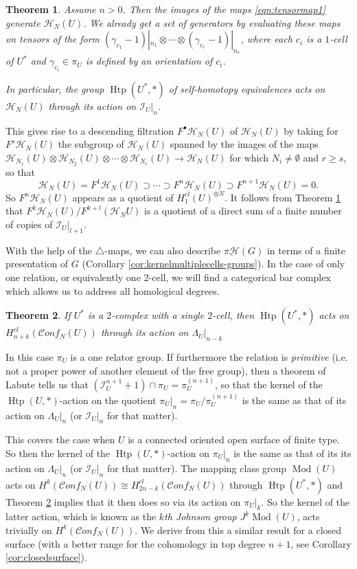 \documentclass[12pt,letterpaper]{amsart}
\numberwithin{equation}{section}
\def\g{\gamma}
\def\tri{\triangle}
\def\Hcal{{\mathcal H}}
\def\Ical{{\mathcal I}}
\def\pt{{\scriptscriptstyle\bullet}}
\newcommand\conf{\mathscr{C}\!\mathit{onf}\!}
\newcommand\Htp{\operatorname{Htp}}
\newcommand\Mod{\operatorname{Mod}}
\newtheorem{theorem}{Theorem}[section]
\theoremstyle{remark}
\begin{document}
\begin{theorem}\label{thm:generation}
Assume $n>0$. Then the images of the  maps \eqref{eqn:tensormap1} generate $\Hcal_N(U)$. We  already get a set of generators by evaluating these maps on  tensors of the form $(\g_{c_1}-1)|_{n_1}\otimes\cdots\otimes (\g_{c_r}-1)|_{n_r}$, where each $c_i$ is a $1$-cell of $U^*$ and $\g_{c_i}\in \pi_U$ is defined by an orientation of $c_i$.

In particular,  the group $\Htp(U^*,*)$ of self-homotopy equivalences acts on $\Hcal_N(U)$  through its action on $\Ical_{U}|_n$.
\end{theorem} 

This gives rise to a descending filtration $F^\pt\Hcal_N(U)$ of $\Hcal_N(U)$ by taking for  $F^s\Hcal_N(U)$ the  subgroup of
$\Hcal_N(U)$ spanned by the images of the maps   $\Hcal_{N_1}(U)\otimes\Hcal_{N_2}(U)\otimes\cdots \otimes\Hcal_{N_r}(U)\to \Hcal_N(U)$ for which $N_i\not=\emptyset$ and $r\ge s$, so that  
\[
\Hcal_N(U)=F^1\Hcal_N(U)\supset \cdots  \supset F^{n}\Hcal_N(U)\supset F^{n+1}\Hcal_N(U)=0.
\]
So  $F^{n} \Hcal_N(U)$ appears as a quotient of $H^{cl}_1(U)^{\otimes N}$. It follows from Theorem \ref{thm:generation} that $F^k\Hcal_N(U)/F^{k+l}(\Hcal_NU)$  is a quotient of a direct sum of a finite number of copies of  $\Ical_{U}|_{l+1}$.

With the help of the $\tri$-maps, we can also  describe $\underline{\pi\Hcal}(G)$ in terms of  a finite presentation of $G$ (Corollary \ref{cor:kernelmultiplecells-groups}). In the case of only one relation, or equivalently one $2$-cell, we will find a categorical bar complex which allows us to address all homological degrees.

\begin{theorem}\label{thm:generation1}
If $U^*$  is a $2$-complex with a single $2$-cell, then $\Htp(U^*,*)$ acts on $H^{cl}_{n+k}(\conf_N(U))$
through its action on $\Lambda_U|_{n-k}$
\end{theorem}  
 
In this case $\pi_U$ is a one relator group. If furthermore the relation is \emph{primitive} (i.e. not a proper power of another element of the free group), then a theorem of Labute \cite{labute} tells us that $(\Ical_U^{n+1}+1)\cap \pi_U=\pi_U^{(n+1)}$, so that  the kernel of the $\Htp(U, *)$-action  on the quotient $\pi_U|_n=\pi_U{/\pi_U^{(n+1)}}$ is the same as that of its action  on $\Lambda_U|_n$ (or $\Ical_U|_n$ for that matter).
\smallskip

This covers the case when $U$ is a connected oriented open surface  of  finite type. 
So then the kernel of the $\Htp(U, *)$-action on $\pi_U|_n$ is the  same as that of its its action  on $\Lambda_U|_n$ (or $\Ical_U|_n$ for that matter).  The mapping class group $\Mod(U)$ acts on $H^k(\conf_N(U))\cong H^{cl}_{2n-k}(\conf_N(U))$ through $\Htp(U^*,*)$ and  Theorem \ref{thm:generation1} implies that it then  does so via its action on $\pi_U|_{k}$. So the kernel of the latter action, which is known as the \emph{$k$th Johnson group $J^k\Mod(U)$}, acts trivially on  $H^k(\conf_N(U))$.
We derive from this  a similar  result for a closed surface (with a better range for the cohomology in top degree $n+1$, see Corollary \ref{cor:closedsurface}).
\end{document}
